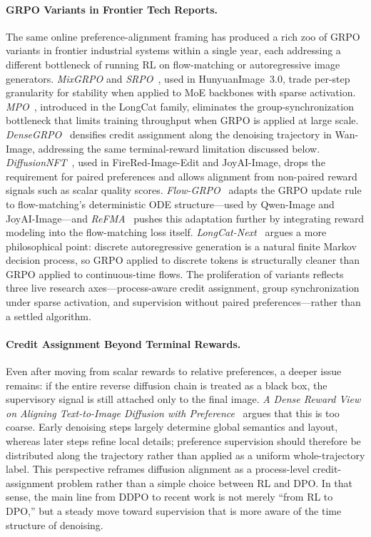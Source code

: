 \documentclass{llmxive}
\begin{document}
\paragraph{GRPO Variants in Frontier Tech Reports.}
{The same online preference-alignment framing has produced a rich zoo of GRPO variants in frontier industrial systems within a single year, each addressing a different bottleneck of running RL on flow-matching or autoregressive image generators. \textit{MixGRPO} and \textit{SRPO}~\citep{cao2025hunyuanimage}, used in HunyuanImage~3.0, trade per-step granularity for stability when applied to MoE backbones with sparse activation. \textit{MPO}~\citep{team2025longcat}, introduced in the LongCat family, eliminates the group-synchronization bottleneck that limits training throughput when GRPO is applied at large scale. \textit{DenseGRPO}~\citep{mao2026wan} densifies credit assignment along the denoising trajectory in Wan-Image, addressing the same terminal-reward limitation discussed below. \textit{DiffusionNFT}~\citep{team2026firered,jdjoyaiimage}, used in FireRed-Image-Edit and JoyAI-Image, drops the requirement for paired preferences and allows alignment from non-paired reward signals such as scalar quality scores. \textit{Flow-GRPO}~\citep{wu2025qwen,jdjoyaiimage} adapts the GRPO update rule to flow-matching's deterministic ODE structure---used by Qwen-Image and JoyAI-Image---and \textit{ReFMA}~\citep{mao2026wan} pushes this adaptation further by integrating reward modeling into the flow-matching loss itself. \textit{LongCat-Next}~\citep{team2026longcat} argues a more philosophical point: discrete autoregressive generation is a natural finite Markov decision process, so GRPO applied to discrete tokens is structurally cleaner than GRPO applied to continuous-time flows. The proliferation of variants reflects three live research axes---process-aware credit assignment, group synchronization under sparse activation, and supervision without paired preferences---rather than a settled algorithm.}

\paragraph{Credit Assignment Beyond Terminal Rewards.}
Even after moving from scalar rewards to relative preferences, a deeper issue remains: if the entire reverse diffusion chain is treated as a black box, the supervisory signal is still attached only to the final image. \textit{A Dense Reward View on Aligning Text-to-Image Diffusion with Preference}~\citep{yang2024dense} argues that this is too coarse. Early denoising steps largely determine global semantics and layout, whereas later steps refine local details; preference supervision should therefore be distributed along the trajectory rather than applied as a uniform whole-trajectory label. This perspective reframes diffusion alignment as a process-level credit-assignment problem rather than a simple choice between RL and DPO. In that sense, the main line from DDPO to recent work is not merely ``from RL to DPO,'' but a steady move toward supervision that is more aware of the time structure of denoising.
\end{document}
